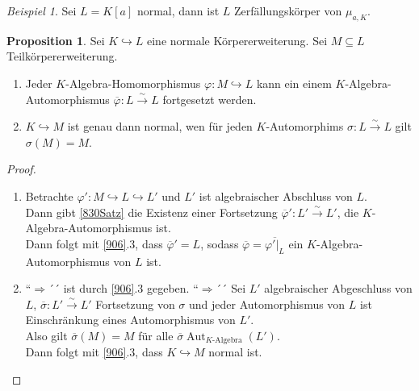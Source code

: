 \documentclass[10pt,a4paper]{article}
\newcommand{\ol}[1]{\overline{#1}}
\newcommand{\isomfunc}{\ensuremath{\xrightarrow{\sim}}}
\newcounter{thm}[section]
\theoremstyle{definition}
\newtheorem{prop}[thm]{Proposition}
\theoremstyle{plain}
\theoremstyle{remark}
\newtheorem*{exm*}{Beispiel}
\begin{document}
\begin{exm*}
	Sei $L=K[a]$ normal, dann ist $L$ Zerfällungskörper von $\mu_{a,K}$.
\end{exm*}

\begin{prop}
	Sei $K\hookrightarrow L$ eine normale Körpererweiterung. Sei $M\subseteq L$ Teilkörpererweiterung.
	\begin{enumerate}
		\item Jeder $K$-Algebra-Homomorphismus $\varphi:M\hookrightarrow L$ kann ein einem $K$-Algebra-Automorphismus $\ol\varphi:L\isomfunc L$ fortgesetzt werden.
		\item $K\hookrightarrow M$ ist genau dann normal, wen für jeden $K$-Automorphims $\sigma:L\isomfunc L$ gilt $\sigma(M)=M$.
	\end{enumerate}
\end{prop}
\begin{proof}
	\begin{enumerate}
		\item Betrachte $\varphi':M\hookrightarrow L\hookrightarrow L'$ und $L'$ ist algebraischer Abschluss von $L$.\\
		Dann gibt \ref{830Satz} die Existenz einer Fortsetzung $\ol\varphi':L'\isomfunc L'$, die $K$-Algebra-Automorphismus ist.\\
		Dann folgt mit \ref{906}.3, dass $\ol \varphi'=L$, sodass $\ol \varphi=\ol{\varphi'|_L}$ ein $K$-Algebra-Automorphismus von $L$ ist.
		
		\item ``$\Rightarrow$´´ ist durch \ref{906}.3 gegeben.
		``$\Rightarrow$´´ Sei $L'$ algebraischer Abgeschluss von $L$, $\ol \sigma:L'\isomfunc L'$ Fortsetzung von $\sigma$ und jeder Automorphismus von $L$ ist Einschränkung eines Automorphismus von $L'$.\\
		Also gilt $\ol \sigma(M)=M$ für alle $\ol \sigma\operatorname{Aut}_{\text{$K$-Algebra}}(L')$.\\
		Dann folgt mit \ref{906}.3, dass $K\hookrightarrow M$ normal ist.
		\end{enumerate}
\end{proof}
\end{document}
